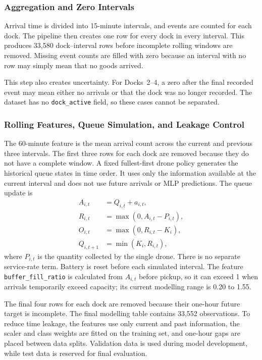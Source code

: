 \documentclass[10pt]{article}
\begin{document}
\subsubsection{Aggregation and Zero Intervals}

Arrival time is divided into 15-minute intervals, and events are counted for each dock. The pipeline then creates one row for every dock in every interval. This produces 33,580 dock--interval rows before incomplete rolling windows are removed. Missing event counts are filled with zero because an interval with no row may simply mean that no goods arrived.

This step also creates uncertainty. For Docks~2--4, a zero after the final recorded event may mean either no arrivals or that the dock was no longer recorded. The dataset has no \texttt{dock\_active} field, so these cases cannot be separated.

\subsubsection{Rolling Features, Queue Simulation, and Leakage Control}

The 60-minute feature is the mean arrival count across the current and previous three intervals. The first three rows for each dock are removed because they do not have a complete window. A fixed fullest-first drone policy generates the historical queue states in time order. It uses only the information available at the current interval and does not use future arrivals or MLP predictions. The queue update is
\begin{align}
A_{i,t} &= Q_{i,t}+a_{i,t},\\
R_{i,t} &= \max(0,A_{i,t}-P_{i,t}),\\
O_{i,t} &= \max(0,R_{i,t}-K_i),\\
Q_{i,t+1} &= \min(K_i,R_{i,t}),
\end{align}
where $P_{i,t}$ is the quantity collected by the single drone. There is no separate service-rate term. Battery is reset before each simulated interval. The feature \texttt{buffer\_fill\_ratio} is calculated from $A_{i,t}$ before pickup, so it can exceed 1 when arrivals temporarily exceed capacity; its current modelling range is 0.20 to 1.55.

The final four rows for each dock are removed because their one-hour future target is incomplete. The final modelling table contains 33,552 observations. To reduce time leakage, the features use only current and past information, the scaler and class weights are fitted on the training set, and one-hour gaps are placed between data splits. Validation data is used during model development, while test data is reserved for final evaluation.
\end{document}
